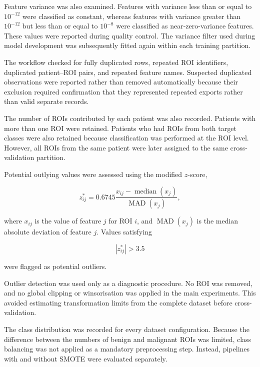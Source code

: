 \documentclass[12pt,twocolumn]{article}
\begin{document}
Feature variance was also examined. Features with variance less than
or equal to \(10^{-12}\) were classified as constant, whereas features
with variance greater than \(10^{-12}\) but less than or equal to
\(10^{-8}\) were classified as near-zero-variance features. These
values were reported during quality control. The variance filter used
during model development was subsequently fitted again within each
training partition.

The workflow checked for fully duplicated rows, repeated ROI
identifiers, duplicated patient--ROI pairs, and repeated feature
names. Suspected duplicated observations were reported rather than
removed automatically because their exclusion required confirmation
that they represented repeated exports rather than valid separate
records.

The number of ROIs contributed by each patient was also recorded.
Patients with more than one ROI were retained. Patients who had ROIs
from both target classes were also retained because classification was
performed at the ROI level. However, all ROIs from the same patient
were later assigned to the same cross-validation partition.

Potential outlying values were assessed using the modified \(z\)-score,

\begin{equation}
z^{*}_{ij}
=
0.6745
\frac{x_{ij}-\operatorname{median}(x_j)}
{\operatorname{MAD}(x_j)},
\label{eq:modified_z_score}
\end{equation}

where \(x_{ij}\) is the value of feature \(j\) for ROI \(i\), and
\(\operatorname{MAD}(x_j)\) is the median absolute deviation of
feature \(j\). Values satisfying

\begin{equation}
\left|z^{*}_{ij}\right| > 3.5
\end{equation}

were flagged as potential outliers.

Outlier detection was used only as a diagnostic procedure. No ROI was
removed, and no global clipping or winsorisation was applied in the
main experiments. This avoided estimating transformation limits from
the complete dataset before cross-validation.

The class distribution was recorded for every dataset configuration.
Because the difference between the numbers of benign and malignant
ROIs was limited, class balancing was not applied as a mandatory
preprocessing step. Instead, pipelines with and without SMOTE were
evaluated separately.
\end{document}
